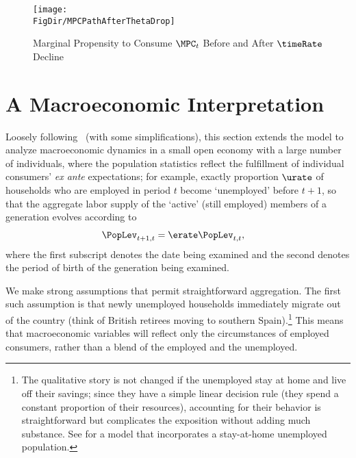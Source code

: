 \documentclass{\handout}
\begin{document}
\begin{figure}
\caption{Marginal Propensity to Consume $\MPC_{t}$ Before and After $\timeRate$ Decline}
\medskip
\texttt{[image: \\FigDir/MPCPathAfterThetaDrop]}
\label{fig:MPCPathAfterThetaDrop}
\end{figure}

\section{A Macroeconomic Interpretation}

Loosely following~\cite{cjSOE} (with some simplifications), this section extends the model to analyze macroeconomic dynamics in a
small open economy with a large number of individuals, where the
population statistics reflect the fulfillment of individual consumers'
{\it ex ante} expectations; for example, exactly proportion $\urate$
of households who are employed in period $t$ become `unemployed' before
$t+1$, so that the aggregate labor supply of the `active' (still employed) members of a generation
evolves according to
\begin{equation}\begin{gathered}\begin{aligned}
  \PopLev_{t+1,t} & =  \erate \PopLev_{t,t}
,
\end{aligned}\end{gathered}\end{equation}
where the first subscript denotes the date being examined and the second denotes
the period of birth of the generation being examined.

We make strong assumptions that permit straightforward aggregation. The first such assumption is that newly unemployed households immediately migrate out of the
country (think of British retirees moving to southern
Spain).\footnote{The qualitative story is not changed if the unemployed stay at home and live off their savings; since they have a simple linear
  decision rule (they spend a constant proportion of their resources),
  accounting for their behavior is straightforward but
  complicates the exposition without adding much substance.  See \cite{cjSOE} for a model that incorporates a stay-at-home unemployed population.}
This means that macroeconomic variables will reflect only the circumstances of 
employed consumers, rather than a blend of the employed and the unemployed.
\end{document}
